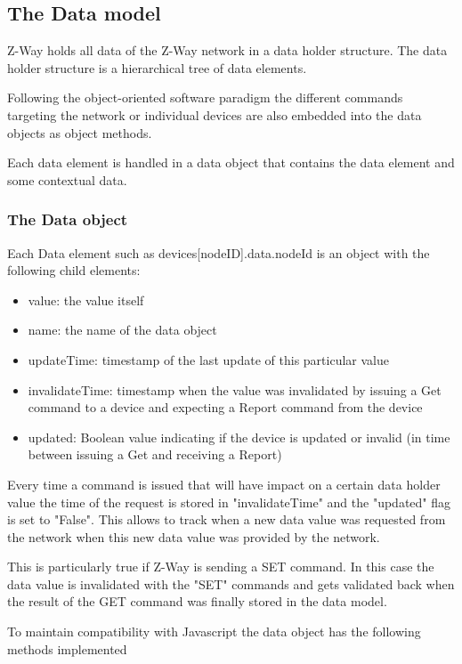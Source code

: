 \subsection{The Data model} 
 
Z-Way holds all data of the Z-Way network  in a data holder structure. The data holder structure is a hierarchical 
tree of data elements.  

Following the object-oriented software paradigm the different commands targeting the network or individual 
devices are also embedded into the data objects as object methods.
 
Each data element is handled in a data object that contains the data element and some contextual data.

\subsubsection{The Data object}
 
Each Data element such as devices[nodeID].data.nodeId is an object with the following child elements:
\begin{itemize}
\item value: the value itself
\item name: the name of the data object
\item updateTime: timestamp of the last update of this particular value
\item invalidateTime: timestamp when the value was invalidated by issuing a Get command to a device and expecting a Report command from the device
\item updated: Boolean value indicating if the device is updated or invalid (in time between issuing a Get and receiving a Report)
\end{itemize}

Every time a command is issued that will have impact on a certain data holder value the time of the request is stored in "invalidateTime" and the "updated"
flag is set to "False". This allows to track when a new data value was requested from the network when this new data value was provided by the network.

This is particularly true if Z-Way is sending a SET command. In this case the data value is invalidated with the "SET" commands and gets validated back when the 
result of the GET command was finally stored in the data model.

To maintain compatibility with Javascript the data object has the following methods implemented

